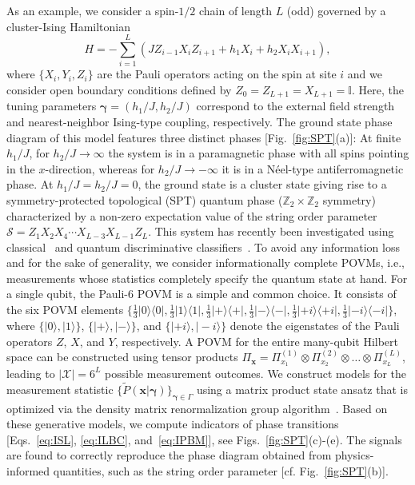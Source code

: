 \documentclass[twocolumn,aps,prl,superscriptaddress,tightlines,nofootinbib]{revtex4-2}
\begin{document}
\indent As an example, we consider a spin-$1/2$ chain of length $L$ (odd) governed by a cluster-Ising Hamiltonian~\cite{smacchia:2011}
\begin{equation}\label{eq:cluster_hamiltonian}
    H = -\sum_{i=1}^{L} \left(JZ_{i-1}X_{i}Z_{i+1} + h_{1}X_{i} + h_{2} X_{i}X_{i+1} \right),
\end{equation}
where $\{X_{i}, Y_{i}, Z_{i}\}$ are the Pauli operators acting on the spin at site $i$ and we consider open boundary conditions defined by $Z_{0} = Z_{L+1}=X_{L+1} = \mathbb{I}$. Here, the tuning parameters $\bm{\gamma} = \left( h_{1}/J,h_{2}/J \right)$ correspond to the external field strength and nearest-neighbor Ising-type coupling, respectively. The ground state phase diagram of this model features three distinct phases [Fig.~\ref{fig:SPT}(a)]: At finite $h_{1}/J$, for  $h_{2}/J \rightarrow \infty$ the system is in a paramagnetic phase with all spins pointing in the $x$-direction, whereas for $h_{2}/J \rightarrow - \infty$  it is in a Néel-type antiferromagnetic phase. At $h_{1}/J = h_{2}/J = 0$, the ground state is a cluster state giving rise to a symmetry-protected topological (SPT) quantum phase ($\mathbb{Z}_{2} \times \mathbb{Z}_{2}$ symmetry) characterized by a non-zero expectation value of the string order parameter $\mathcal{S} = Z_{1}X_{2}X_{4}\cdots X_{L-3}X_{L-1}Z_{L}$. This system has recently been investigated using classical~\cite{sadoune:2023} and quantum discriminative classifiers~\cite{herrmann:2022}. To avoid any information loss and for the sake of generality, we consider informationally complete POVMs, i.e., measurements whose statistics completely specify the quantum state at hand. For a single qubit, the Pauli-$6$ POVM is a simple and common choice. It consists of the six POVM elements $\{ \frac{1}{3}| 0 \rangle \langle 0 |,\frac{1}{3}| 1 \rangle \langle 1 |,\frac{1}{3}| + \rangle \langle + |,\frac{1}{3}| - \rangle \langle - |,\frac{1}{3}| +i \rangle \langle +i |,\frac{1}{3}| -i \rangle \langle -i | \}$, where $\{ | 0 \rangle, | 1 \rangle\}$, $\{ | + \rangle, | - \rangle\}$, and $\{ | +i \rangle, | -i \rangle\}$ denote the eigenstates of the Pauli operators $Z$, $X$, and $Y$, respectively. A POVM for the entire many-qubit Hilbert space can be constructed using tensor products $\Pi_{\bm{x}} = \Pi_{x_{1}}^{(1)} \otimes \Pi_{x_{2}}^{(2)} \otimes \dots \otimes \Pi_{x_{L}}^{(L)}$, leading to $|\mathcal{X}| = 6^L$ possible measurement outcomes. We construct models for the measurement statistic $\{ \tilde{P}(\bm{x}|\bm{\gamma})\}_{\bm{\gamma} \in \Gamma}$ using a matrix product state ansatz that is optimized via the density matrix renormalization group algorithm~\cite{suppl}. Based on these generative models, we compute indicators of phase transitions [Eqs.~\eqref{eq:ISL}, \eqref{eq:ILBC}, and~\eqref{eq:IPBM}], see Figs.~\ref{fig:SPT}(c)-(e). The signals are found to correctly reproduce the phase diagram obtained from physics-informed quantities, such as the string order parameter [cf. Fig.~\ref{fig:SPT}(b)].
\end{document}
